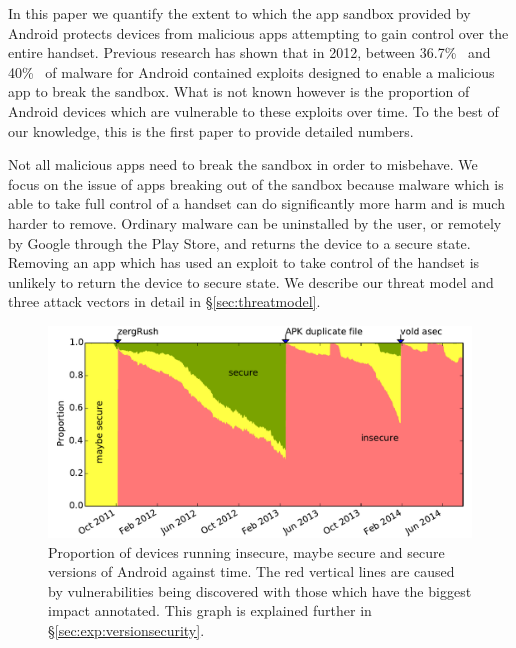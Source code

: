 \documentclass{llncs}
\newcommand{\percMarketShare}{83.6\%~\footnote{\url{http://www.theinquirer.net/inquirer/news/2379036/android-hits-836-percent-marketshare-while-ios-windows-and-blackberry-slide}}}
\begin{document}
In this paper we quantify the extent to which the app sandbox provided by Android protects devices from malicious apps attempting to gain control over the entire handset.
Previous research has shown that in 2012, between 36.7\%~\cite{Zhou2012b} and 40\%~\cite{Zhou2012a} of malware for Android contained exploits designed to enable a malicious app to break the sandbox.
What is not known however is the proportion of Android devices which are vulnerable to these exploits over time.
To the best of our knowledge, this is the first paper to provide detailed numbers.

Not all malicious apps need to break the sandbox in order to misbehave.
We focus on the issue of apps breaking out of the sandbox because malware which is able to take full control of a handset can do significantly more harm and is much harder to remove.
Ordinary malware can be uninstalled by the user, or remotely by Google through the Play Store, and returns the device to a secure state. 
Removing an app which has used an exploit to take control of the handset is unlikely to return the device to secure state.
We describe our threat model and three attack vectors in detail in \S\ref{sec:threatmodel}.

 
\begin{figure}[h]
\centering
\includegraphics[width=\columnwidth]{figures/proportioninsecure}
\caption{Proportion of devices running insecure, maybe secure and secure versions of Android against time.
The red vertical lines are caused by vulnerabilities being discovered with those which have the biggest impact annotated.
This graph is explained further in \S\ref{sec:exp:versionsecurity}.
}
\label{fig:proportioninsecure}
\end{figure}
\end{document}
